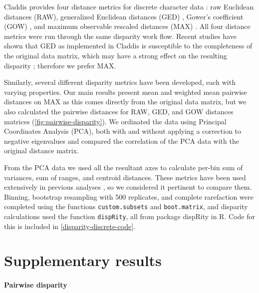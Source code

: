 \documentclass[british,a4paper]{article}
\newcommand\pcref[1]{(\cref{#1})}
\begin{document}
\indent Claddis provides four distance metrics for discrete character data
\autocite{Lloyd2016BJLS}: raw Euclidean distances (RAW), generalized Euclidean
distances (GED) \autocite{Wills1994P}, Gower's coefficient (GOW)
\autocite{Gower1971B}, and maximum observable rescaled distances (MAX)
\autocite{Lloyd2016BJLS}. All four distance metrics were run through the same
disparity work flow. Recent studies have shown that GED as implemented in
Claddis is susceptible to the completeness of the original data matrix, which
may have a strong effect on the resulting disparity
\autocite{FlannerySutherland2019PRSBBS, Lehmann2019P}; therefore we prefer MAX\@.

Similarly, several different disparity metrics have been developed, each with
varying properties. Our main results present mean and weighted mean pairwise
distances on MAX as this comes directly from the original data matrix, but we
also calculated the pairwise distances for RAW, GED, and GOW distances matrices
\pcref{fig:pairwise-disparity}. We ordinated the data using Principal
Coordinates Analysis (PCA), both with and without applying a correction to
negative eigenvalues \autocite{Caillez1983P} and compared the correlation of the
PCA data with the original distance matrix. 

From the PCA data we used all the resultant axes to calculate per-bin sum of
variances, sum of ranges, and centroid distances. These metrics have been used
extensively in previous analyses \autocite{Wills1998BJLS, Thorne2011PNAS,
FlannerySutherland2019PRSBBS}, so we considered it pertinent to compare them.
Binning, bootstrap resampling with 500 replicates, and complete rarefaction
were completed using the functions \texttt{custom.subsets} and
\texttt{boot.matrix}, and disparity calculations used the function
\texttt{dispRity}, all from package dispRity \autocite{Guillerme2018MEE} in R.
Code for this is included in \cref{disparity-discrete-code}.


\section{Supplementary results}\label{sec:supplemental-results}

\paragraph{Pairwise disparity}\label{par:pairwise-disparity}
\end{document}
